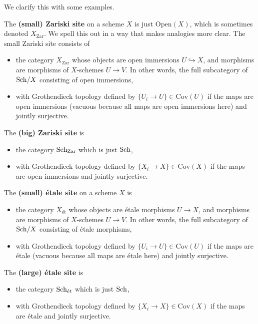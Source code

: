 \documentclass[12pt]{article}
\newcommand{\et}{\text{\'{e}t}}
\newcommand{\Zar}{\mathrm{Zar}}
\newcommand{\Cov}{\mathrm{Cov}}
\begin{document}
We clarify this with some examples.

\begin{defn}
    The \textbf{(small) Zariski site} on a scheme $X$ is just $\mathrm{Open}(X)$, which is sometimes denoted $X_\Zar$. We spell this out in a way that makes analogies more clear. The small Zariski site consists of
    \begin{itemize}
        \item the category $X_\Zar$ whose objects are open immersions $U\hookrightarrow X$, and morphisms are morphisms of $X$-schemes $U\to V$. In other words, the full subcategory of $\mathrm{Sch}/X$ consisting of open immersions,
        \item with Grothendieck topology defined by $\{U_i\to U\}\in \Cov(U)$ if the maps are open immersions (vacuous because all maps are open immersions here) and jointly surjective.
    \end{itemize}

    The \textbf{(big) Zariski site} is
    \begin{itemize}
        \item the category $\Sch_\Zar$ which is just $\mathrm{Sch}$,
        \item with Grothendieck topology defined by $\{X_i\to X\}\in \Cov(X)$ if the maps are open immersions and jointly surjective.
    \end{itemize}
\end{defn}


\begin{defn}
    The \textbf{(small) \'etale site} on a scheme $X$ is
    \begin{itemize}
        \item the category $X_\et$ whose objects are \'etale morphisms $U\to X$, and morphisms are morphisms of $X$-schemes $U\to V$. In other words, the full subcategory of $\mathrm{Sch}/X$ consisting of \'etale morphisms,
        \item with Grothendieck topology defined by $\{U_i\to U\}\in \Cov(U)$ if the maps are \'etale (vacuous because all maps are \'etale here) and jointly surjective.
    \end{itemize}
    The \textbf{(large) \'etale site} is
    \begin{itemize}
        \item the category $\Sch_\et$ which is just $\mathrm{Sch}$,
        \item with Grothendieck topology defined by $\{X_i \to X\}\in \Cov(X)$ if the maps are \'etale and jointly surjective.
    \end{itemize}
\end{defn}
\end{document}
